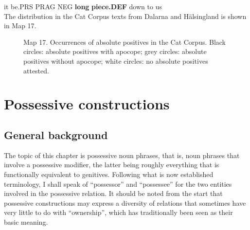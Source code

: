 it  be.PRS  PRAG  NEG  \textbf{long} \textbf{piece.DEF} down  to  us\\ %


The distribution in the Cat Corpus texts from Dalarna and Hälsingland is shown in Map 17.



\begin{figure}[h]
\centering
\begin{minipage}{3.67708in}
\label{bkm:Ref160012437}Map 17. Occurrences of absolute positives in the Cat Corpus. Black circles: absolute positives with apocope; grey circles: absolute positives without apocope; white circles: no absolute positives attested.
\end{minipage}
\end{figure}
\section[Possessive constructions]{\rmfamily Possessive constructions}
\label{bkm:Ref155077914}\subsection[General background]{\rmfamily General background}
The topic of this chapter is possessive noun phrases, that is, noun phrases that involve a possessive modifier, the latter being roughly everything that is functionally equivalent to genitives. Following what is now established terminology, I shall speak of “possessor” and “possessee” for the two entities involved in the possessive relation. It should be noted from the start that possessive constructions may express a diversity of relations that sometimes have very little to do with “ownership”, which has traditionally been seen as their basic meaning. 

